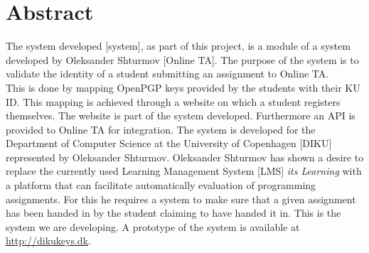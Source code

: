\documentclass[11pt,a4paper]{report}
\begin{document}
\section{Abstract}\label{sec:Abstract}
The system developed [system], as part of this project, is a module of a system developed by Oleksander Shturmov [Online TA]. The purpose of the system is to validate the identity of a student submitting an assignment to Online TA. \\
This is done by mapping OpenPGP keys provided by the students with their KU ID. This mapping is achieved through a website on which a student registers themselves. The website is part of the system developed. Furthermore an API is provided to Online TA for integration. The system is developed for the Department of Computer Science at the University of Copenhagen [DIKU] represented by Oleksander Shturmov. Oleksander Shturmov has shown a desire to replace the currently used Learning Management System [LMS] \textit{its Learning} with a platform that can facilitate automatically evaluation of programming assignments. For this he requires a system to make sure that a given assignment has been handed in by the student claiming to have handed it in. This is the system we are developing.
A prototype of the system is available at \url{http://dikukeys.dk}.
\end{document}
